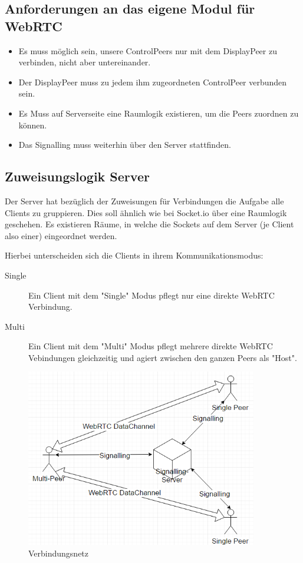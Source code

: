 \subsection{Anforderungen an das eigene Modul für WebRTC}
\begin{itemize}
\item 
Es muss möglich sein, unsere ControlPeers nur mit dem DisplayPeer zu verbinden, nicht aber untereinander.

\item
Der DisplayPeer muss zu jedem ihm zugeordneten ControlPeer verbunden sein.

\item
Es Muss auf Serverseite eine Raumlogik existieren, um die Peers zuordnen zu können.

\item
Das Signalling muss weiterhin über den Server stattfinden.
\end{itemize}

\subsection{Zuweisungslogik Server}
Der Server hat bezüglich der Zuweisungen für Verbindungen die Aufgabe alle Clients zu gruppieren. Dies soll ähnlich wie bei Socket.io über eine Raumlogik geschehen. Es existieren Räume, in welche die Sockets auf dem Server (je Client also einer) eingeordnet werden.


Hierbei unterscheiden sich die Clients in ihrem Kommunikationsmodus:
\begin{description}
\item[Single]
Ein Client mit dem "Single" Modus pflegt nur eine direkte WebRTC Verbindung.

\item[Multi]
Ein Client mit dem "Multi" Modus pflegt mehrere direkte WebRTC Vebindungen gleichzeitig und agiert zwischen den ganzen Peers als "Host".
\end{description}

\begin{figure}[ht]
\centering
\includegraphics[width=0.9\textwidth]{backend/ConnectionBetweenPeers.PNG}
\caption{Verbindungsnetz}
\label{backfig1}
\end{figure}

